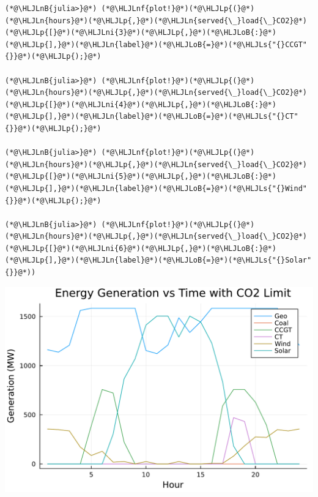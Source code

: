 \documentclass[12pt,a4paper]{article}
\newcommand{\HLJLn}[1]{#1}
\newcommand{\HLJLnf}[1]{\textcolor[RGB]{66,102,213}{#1}}
\newcommand{\HLJLs}[1]{\textcolor[RGB]{201,61,57}{#1}}
\newcommand{\HLJLnB}[1]{\textcolor[RGB]{59,151,46}{#1}}
\newcommand{\HLJLni}[1]{\textcolor[RGB]{59,151,46}{#1}}
\newcommand{\HLJLoB}[1]{\textcolor[RGB]{102,102,102}{\textbf{#1}}}
\newcommand{\HLJLp}[1]{#1}
\begin{document}
\begin{lstlisting}
(*@\HLJLnB{julia>}@*) (*@\HLJLnf{plot!}@*)(*@\HLJLp{(}@*)(*@\HLJLn{hours}@*)(*@\HLJLp{,}@*)(*@\HLJLn{served{\_}load{\_}CO2}@*)(*@\HLJLp{[}@*)(*@\HLJLni{3}@*)(*@\HLJLp{,}@*)(*@\HLJLoB{:}@*)(*@\HLJLp{],}@*)(*@\HLJLn{label}@*)(*@\HLJLoB{=}@*)(*@\HLJLs{"{}CCGT"{}}@*)(*@\HLJLp{);}@*)

(*@\HLJLnB{julia>}@*) (*@\HLJLnf{plot!}@*)(*@\HLJLp{(}@*)(*@\HLJLn{hours}@*)(*@\HLJLp{,}@*)(*@\HLJLn{served{\_}load{\_}CO2}@*)(*@\HLJLp{[}@*)(*@\HLJLni{4}@*)(*@\HLJLp{,}@*)(*@\HLJLoB{:}@*)(*@\HLJLp{],}@*)(*@\HLJLn{label}@*)(*@\HLJLoB{=}@*)(*@\HLJLs{"{}CT"{}}@*)(*@\HLJLp{);}@*)

(*@\HLJLnB{julia>}@*) (*@\HLJLnf{plot!}@*)(*@\HLJLp{(}@*)(*@\HLJLn{hours}@*)(*@\HLJLp{,}@*)(*@\HLJLn{served{\_}load{\_}CO2}@*)(*@\HLJLp{[}@*)(*@\HLJLni{5}@*)(*@\HLJLp{,}@*)(*@\HLJLoB{:}@*)(*@\HLJLp{],}@*)(*@\HLJLn{label}@*)(*@\HLJLoB{=}@*)(*@\HLJLs{"{}Wind"{}}@*)(*@\HLJLp{);}@*)

(*@\HLJLnB{julia>}@*) (*@\HLJLnf{plot!}@*)(*@\HLJLp{(}@*)(*@\HLJLn{hours}@*)(*@\HLJLp{,}@*)(*@\HLJLn{served{\_}load{\_}CO2}@*)(*@\HLJLp{[}@*)(*@\HLJLni{6}@*)(*@\HLJLp{,}@*)(*@\HLJLoB{:}@*)(*@\HLJLp{],}@*)(*@\HLJLn{label}@*)(*@\HLJLoB{=}@*)(*@\HLJLs{"{}Solar"{}}@*))
\end{lstlisting}
\includegraphics[width=\linewidth]{figures/as2752_hw3_12_1.pdf}
\end{document}
